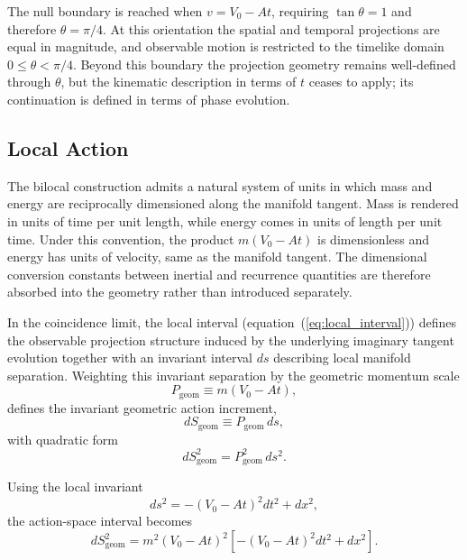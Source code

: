\documentclass[fontsize=12pt, paper=a4]{scrartcl}
\begin{document}
The null boundary is reached when $v = V_0 - At$, requiring $\tan\theta = 1$ and therefore $\theta = \pi/4$. At this orientation the spatial and temporal projections are equal in magnitude, and observable motion is restricted to the timelike domain $0 \le \theta < \pi/4$. Beyond this boundary the projection geometry remains well-defined through $\theta$, but the kinematic description in terms of $t$ ceases to apply; its continuation is defined in terms of phase evolution.

\subsection{Local Action}

The bilocal construction admits a natural system of units in which mass and energy are reciprocally dimensioned along the manifold tangent. Mass is rendered in units of time per unit length, while energy comes in units of length per unit time. Under this convention, the product $m(V_0-At)$ is dimensionless and energy has units of velocity, same as the manifold tangent. The dimensional conversion constants between inertial and recurrence quantities are therefore absorbed into the geometry rather than introduced separately.

In the coincidence limit, the local interval (equation~(\ref{eq:local_interval})) defines the observable projection structure induced by the underlying imaginary tangent evolution together with an invariant interval $ds$ describing local manifold separation. Weighting this invariant separation by the geometric momentum scale
\begin{equation}
P_{\mathrm{geom}} \equiv m(V_0-At),
\end{equation}
defines the invariant geometric action increment,
\begin{equation}
dS_{\mathrm{geom}} \equiv P_{\mathrm{geom}}\,ds,
\end{equation}
with quadratic form
\begin{equation}
dS_{\mathrm{geom}}^2 = P_{\mathrm{geom}}^2\,ds^2.
\end{equation}

Using the local invariant
\begin{equation}
ds^2 = - (V_0 - At)^2 dt^2 + dx^2,
\end{equation}
the action-space interval becomes
\begin{equation}
dS_{\mathrm{geom}}^2 =m^2(V_0-At)^2\left[-(V_0-At)^2 dt^2 + dx^2\right].
\end{equation}
\end{document}
